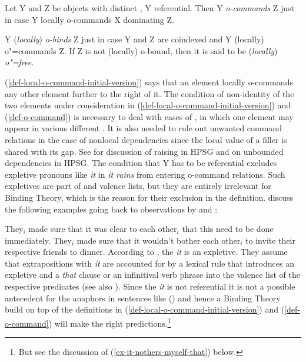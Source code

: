 \documentclass[output=paper
 	        ,biblatex
                ,babelshorthands
                ,newtxmath
                ,draftmode
                ,colorlinks, citecolor=brown
]{langscibook}
\begin{document}
\eanoraggedright
\label{def-o-command}
Let Y and Z be  objects with distinct \localvs, Y referential. Then Y \emph{o-commands} Z just
in case Y locally o-commands X dominating Z.
\z

\eanoraggedright
\label{def-o-bind}
Y (\emph{locally}) \emph{o-binds} Z just in case Y and Z are coindexed and Y (locally) o"=commands Z. If Z
is not (locally) o-bound, then it is said to be (\emph{locally}) \emph{o"=free}.
\z

\noindent
(\ref{def-local-o-command-initial-version}) says that an \argst element locally o-commands any other \argst element
further to the right of it. The condition of non-identity of the two elements under consideration in
(\ref{def-local-o-command-initial-version}) and (\ref{def-o-command}) is necessary to deal with cases of , in
which one element may appear in various different \argstls. It is also needed to rule out unwanted
command relations in the case of nonlocal dependencies since the local value of a filler is shared
with its gap. See %
 for discussion of raising in HPSG and  on
unbounded dependencies in HPSG. The condition that Y has
to be referential excludes expletive pronouns like \emph{it} in \emph{it rains} from entering
o-command relations. Such expletives are part of \argst and valence lists, but they are entirely
irrelevant for Binding Theory, which is the reason for their exclusion in the
definition. \citet[]{ps2} discuss the following examples going back to observations by
\citet[]{FH83a-u} and \citet[]{Kuno87a-u}:

\eal
\ex They$_i$ made sure that it was clear to each other$_i$ that this need to be done immediately.
\ex They$_i$ made sure that it wouldn't bother each other$_i$ to invite their respective friends to dinner.
\zl
According to \citet[Section~3.6]{ps2}, the \emph{it} is an expletive. They assume that
extrapositions with \emph{it} are accounted for by a lexical rule that introduces an expletive and a
\emph{that} clause or an infinitival verb phrase into the valence list of the respective predicates
(see also ). Since the \emph{it} is
not referential it is not a possible antecedent for the anaphors in sentences like () and
hence a Binding Theory build on top of the definitions in
(\ref{def-local-o-command-initial-version}) and (\ref{def-o-command}) will make the right
predictions.\footnote{
But see the discussion of (\ref{ex-it-nothers-myself-that}) below.
} 
\end{document}
